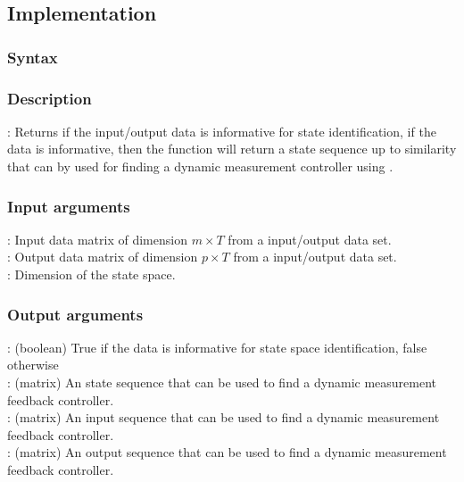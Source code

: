 \subsection{Implementation}
\subsubsection*{Syntax}

\subsubsection*{Description}
: Returns if the input/output data is informative for state identification, if the data is informative, then the function will return a state sequence up to similarity that can by used for finding a dynamic measurement controller using .

\subsubsection*{Input arguments}
\textbf{}: Input data matrix of dimension $m \times T$ from a input/output data set.\\
\textbf{}: Output data matrix of dimension $p \times T$ from a input/output data set.\\
\textbf{}: Dimension of the state space.

\subsubsection*{Output arguments}
\textbf{}: (boolean) True if the data is informative for state space identification, false otherwise\\
\textbf{}: (matrix) An state sequence that can be used to find a dynamic measurement feedback controller.\\
\textbf{}: (matrix) An input sequence that can be used to find a dynamic measurement feedback controller.\\
\textbf{}: (matrix) An output sequence that can be used to find a dynamic measurement feedback controller.

